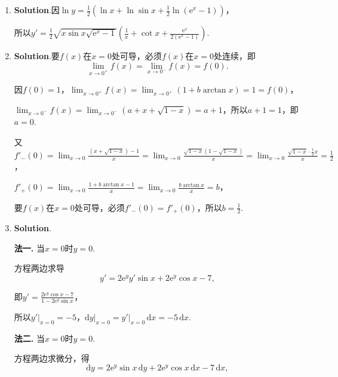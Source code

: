 \documentclass[../Main.tex]{subfiles}
\begin{document}
\begin{enumerate}
          所以$x=0,1$是可去间断点；

          当$k=-1,\pm2,\pm3,\cdots$时，$\lim_{x\to k}f(x)=\infty$，所以$x=-1,\pm2,\pm
              3,\cdots$是无穷间断点.

    \item \textbf{Solution}.因$\ln y=\frac{1}{2}\left(\ln x+\ln\sin x+\frac{1}{2}
              \ln\left(\mathrm{e}^{x}-1\right)\right)$，

          所以$y'=\frac{1}{2}\sqrt{x\sin x\sqrt{\mathrm{e}^{x}-1}}\left(\frac{1}{x}+\cot
              x+\frac{\mathrm{e}^{x}}{2(\mathrm{e}^{x}-1)}\right)$.

    \item \textbf{Solution}.要$f(x)$在$x=0$处可导，必须$f(x)$在$x=0$处连续，即
          \[
              \lim_{x\to0^+}f(x)=\lim_{x\to0^-}f(x)=f(0).
          \]

          因$f(0)=1$，$\lim_{x\to0^+}f(x)=\lim_{x\to0^+}(1+b\arctan x)=1=f(0)$，

          $\lim_{x\to0^-}f(x)=\lim_{x\to0^-}(a+x+\sqrt{1-x})=a+1$，所以$a+1=1$，即$a=
              0$.

          又$f'_{-}(0)=\lim_{x\to0}\frac{(x+\sqrt{1-x})-1}{x}=\lim_{x\to0}\frac{\sqrt{1-x}(1-\sqrt{1-x})}{x}
              =\lim_{x\to0}\frac{\sqrt{1-x}\cdot\frac{1}{2}x}{x}=\frac{1}{2}$，

          $f'_{+}(0)=\lim_{x\to0}\frac{1+b\arctan x-1}{x}=\lim_{x\to0}\frac{b\arctan x}{x}
              =b$，

          要$f(x)$在$x=0$处可导，必须$f'_{-}(0)=f'_{+}(0)$，所以$b=\frac{1}{2}$.

    \item \textbf{Solution}.

          \textbf{法一.} 当$x=0$时$y=0$.

          方程两边求导
          \[
              y'=2\mathrm{e}^{y}y'\sin x+2\mathrm{e}^{y}\cos x-7,
          \]

          即$y'=\frac{2\mathrm{e}^{y}\cos x-7}{1-2\mathrm{e}^{y}\sin x}$，

          所以$\left.y'\right|_{x=0}=-5$，$\left.\mathrm{d}y\right|_{x=0}=\left.y'\right
              |_{x=0}\,\mathrm{d}x=-5\,\mathrm{d}x$.

          \textbf{法二.} 当$x=0$时$y=0$.

          方程两边求微分，得
          \[
              \mathrm{d}y=2\mathrm{e}^{y}\sin x\,\mathrm{d}y+2\mathrm{e}^{y}\cos x\,\mathrm{d}
              x-7\,\mathrm{d}x,
          \]


\end{enumerate}
\end{document}
